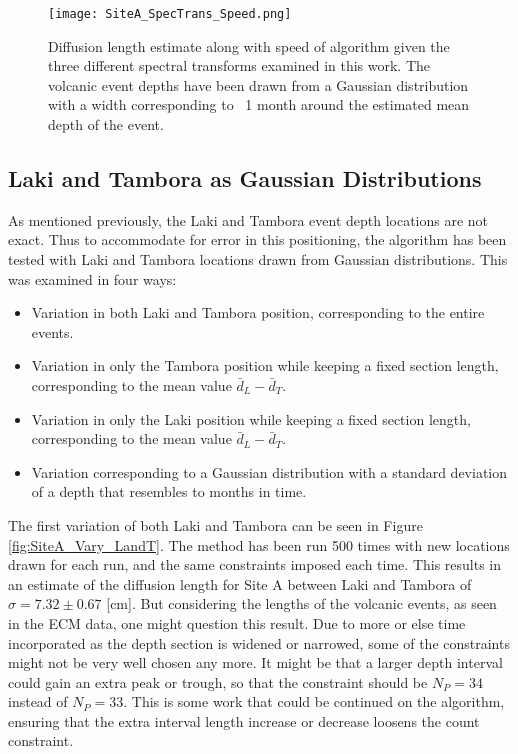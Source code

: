 \documentclass[../../CompleteThesis2/Complete_2ndDraft]{subfiles}
\begin{document}
\begin{figure}[!htb]
	\centering
	\texttt{[image: SiteA\_SpecTrans\_Speed.png]}
	\caption[Speed and $\sigma$ Estimates, Spectral Transforms]{\small Diffusion length estimate along with speed of algorithm given the three different spectral transforms examined in this work. The volcanic event depths have been drawn from a Gaussian distribution with a width corresponding to ~1 month around the estimated mean depth of the event.}
	\label{fig:SiteA_SpecTrans_Speed}
\end{figure}




\subsection[LT locations]{Laki and Tambora as Gaussian Distributions}
\label{Subsec:Method_TestStab_LTlocations}
As mentioned previously, the Laki and Tambora event depth locations are not exact. Thus to accommodate for error in this positioning, the algorithm has been tested with Laki and Tambora locations drawn from Gaussian distributions. This was examined in four ways:

\begin{itemize}
	\item Variation in both Laki and Tambora position, corresponding to the entire events.
	\item Variation in only the Tambora position while keeping a fixed section length, corresponding to the mean value $\bar{d}_{L}-\bar{d}_{T}$.
	\item Variation in only the Laki position while keeping a fixed section length, corresponding to the mean value $\bar{d}_{L}-\bar{d}_{T}$.
	\item Variation corresponding to a Gaussian distribution with a standard deviation of a depth that resembles to months in time.
	
\end{itemize}

The first variation of both Laki and Tambora can be seen in Figure \ref{fig:SiteA_Vary_LandT}. The method has been run 500 times with new locations drawn for each run, and the same constraints imposed each time. This results in an estimate of the diffusion length for Site A between Laki and Tambora of $\sigma=7.32\pm 0.67$ [cm]. But considering the lengths of the volcanic events, as seen in the ECM data, one might question this result. Due to more or else time incorporated as the depth section is widened or narrowed, some of the constraints might not be very well chosen any more. It might be that a larger depth interval could gain an extra peak or trough, so that the constraint should be $N_P=34$ instead of $N_P =33$. This is some work that could be continued on the algorithm, ensuring that the extra interval length increase or decrease loosens the count constraint.
\end{document}
